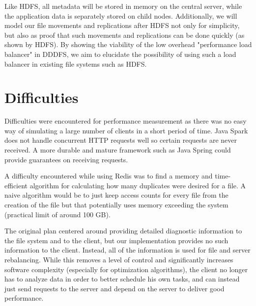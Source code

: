\documentclass[twoside]{article}
\begin{document}
\begin{multicols}{2}
Like HDFS, all metadata will be stored in memory on the central server, while the application data is separately stored on child nodes. Additionally, we will model our file movements and replications after HDFS not only for simplicity, but also as proof that such movements and replications can be done quickly (as shown by HDFS). By showing the viability of the low overhead "performance load balancer" in DDDFS, we aim to elucidate the possibility of using such a load balancer in existing file systems such as HDFS.

\section{Difficulties}
Difficulties were encountered for performance measurement as there was no easy way of simulating a large number of clients in a short period of time. Java Spark does not handle concurrent HTTP requests well so certain requests are never received. A more durable and mature framework such as Java Spring could provide guarantees on receiving requests.

A difficulty encountered while using Redis was to find a memory and time-efficient algorithm for calculating how many duplicates were desired for a file. A naive algorithm would be to just keep access counts for every file from the creation of the file but that potentially uses memory exceeding the system (practical limit of around 100 GB).

The original plan centered around providing detailed diagnostic information to the file system and to the client, but our implementation provides no such information to the client. Instead, all of the information is used for file and server rebalancing. While this removes a level of control and significantly increases software complexity (especially for optimization algorithms), the client no longer has to analyze data in order to better schedule his own tasks, and can instead just send requests to the server and depend on the server to deliver good performance.



\end{multicols}
\end{document}
